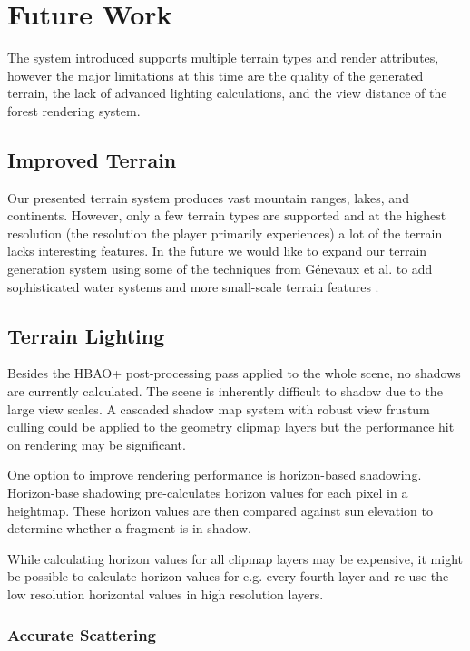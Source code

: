 
\chapter{Future Work} \label{futurework}

The system introduced supports multiple terrain types and render attributes, however the major limitations at this time are the quality of the generated terrain, the lack of advanced lighting calculations, and the view distance of the forest rendering system.

\section{Improved Terrain}

Our presented terrain system produces vast mountain ranges, lakes, and continents.
However, only a few terrain types are supported and at the highest resolution (the resolution the player primarily experiences) a lot of the terrain lacks interesting features.
In the future we would like to expand our terrain generation system using some of the techniques from G{\'e}nevaux et al. to add sophisticated water systems and more small-scale terrain features \cite{hydrology}.

\section{Terrain Lighting}

Besides the HBAO+ post-processing pass applied to the whole scene, no shadows are currently calculated.
The scene is inherently difficult to shadow due to the large view scales.
A cascaded shadow map system with robust view frustum culling could be applied to the geometry clipmap layers but the performance hit on rendering may be significant.

One option to improve rendering performance is horizon-based shadowing.
Horizon-base shadowing pre-calculates horizon values for each pixel in a heightmap.
These horizon values are then compared against sun elevation to determine whether a fragment is in shadow.

While calculating horizon values for all clipmap layers may be expensive, it might be possible to calculate horizon values for e.g. every fourth layer and re-use the low resolution horizontal values in high resolution layers.


\subsection{Accurate Scattering}

